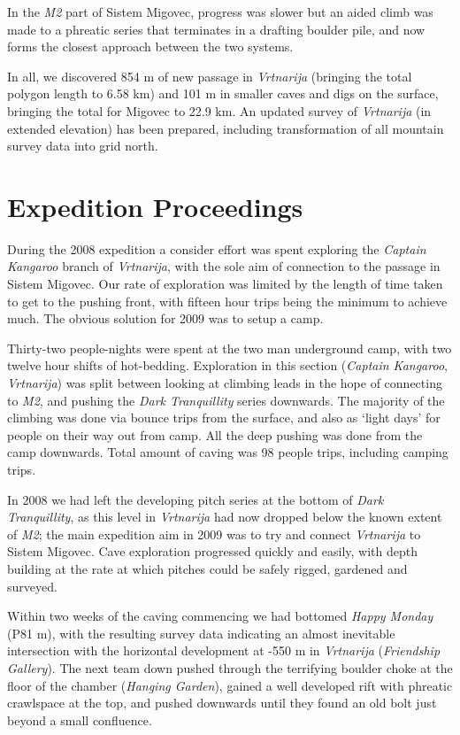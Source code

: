 In the \emph{M2} part of Sistem Migovec, progress was slower but an
aided climb was made to a phreatic series that terminates in a drafting
boulder pile, and now forms the closest approach between the two
systems.

In all, we discovered 854 m of new passage in \emph{Vrtnarija} (bringing
the total polygon length to 6.58 km) and 101 m in smaller caves and digs
on the surface, bringing the total for Migovec to 22.9 km. An updated
survey of \emph{Vrtnarija} (in extended elevation) has been prepared,
including transformation of all mountain survey data into grid north.

\hypertarget{expedition-proceedings}{%
\section{Expedition Proceedings}\label{expedition-proceedings}}

During the 2008 expedition a consider effort was spent exploring the
\emph{Captain Kangaroo} branch of \emph{Vrtnarija}, with the sole aim of
connection to the passage in Sistem Migovec. Our rate of exploration was
limited by the length of time taken to get to the pushing front, with
fifteen hour trips being the minimum to achieve much. The obvious
solution for 2009 was to setup a camp.

Thirty-two people-nights were spent at the two man underground camp,
with two twelve hour shifts of hot-bedding. Exploration in this section
(\emph{Captain Kangaroo}, \emph{Vrtnarija}) was split between looking at
climbing leads in the hope of connecting to \emph{M2}, and pushing the
\emph{Dark Tranquillity} series downwards. The majority of the climbing
was done via bounce trips from the surface, and also as `light days' for
people on their way out from camp. All the deep pushing was done from
the camp downwards. Total amount of caving was 98 people trips,
including camping trips.

In 2008 we had left the developing pitch series at the bottom of
\emph{Dark Tranquillity}, as this level in \emph{Vrtnarija} had now
dropped below the known extent of \emph{M2}; the main expedition aim in
2009 was to try and connect \emph{Vrtnarija} to Sistem Migovec. Cave
exploration progressed quickly and easily, with depth building at the
rate at which pitches could be safely rigged, gardened and surveyed.

Within two weeks of the caving commencing we had bottomed \emph{Happy
Monday} (P81 m), with the resulting survey data indicating an almost
inevitable intersection with the horizontal development at -550 m in
\emph{Vrtnarija} (\emph{Friendship Gallery}). The next team down pushed
through the terrifying boulder choke at the floor of the chamber
(\emph{Hanging Garden}), gained a well developed rift with phreatic
crawlspace at the top, and pushed downwards until they found an old bolt
just beyond a small confluence.

